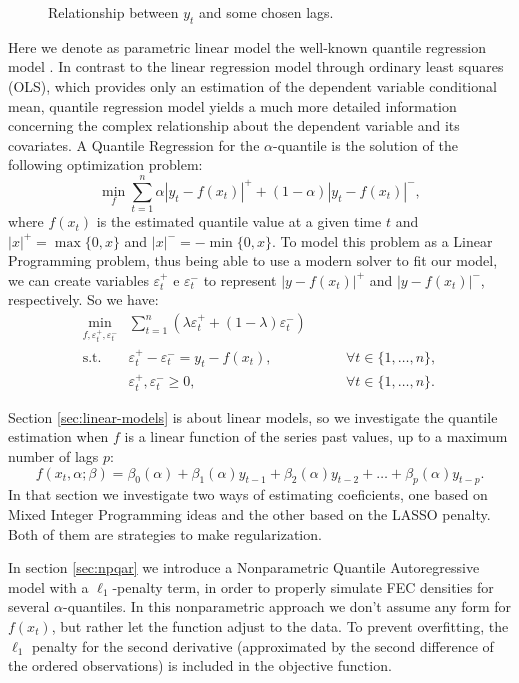 \begin{figure}
\begin{minipage}[t]{0.45\linewidth}
\begin{minipage}[b]{\linewidth}
    \end{minipage}
  \end{minipage}
  \caption{Relationship between $y_t$ and some chosen lags.}
  \label{lags-icaraizinho}
\end{figure}

Here we denote as parametric linear model the well-known quantile regression model \cite{koenker2005quantile}. In contrast to the linear regression model through ordinary least squares (OLS), which provides only an estimation of the dependent variable conditional mean, quantile regression model yields a much more detailed information concerning the complex relationship about the dependent variable and its covariates. A Quantile Regression for the $\alpha$-quantile is the solution of the following optimization problem:
\begin{equation}
\min_{f}\sum_{t=1}^{n}\alpha|y_{t}-f(x_t)|^{+}+(1-\alpha)|y_{t}-f(x_t)|^{-},
\label{eq:linear-model}
\end{equation}
where $f(x_t)$ is the estimated quantile value at a given time $t$ and $|x|^+=\max\{0,x\}$ and $|x|^-=-\min\{0,x\}$. To model this problem as a Linear Programming problem, thus being able to use a modern solver to fit our model,  we can create variables $\varepsilon^+_t$ e $\varepsilon^-_t$ to represent $|y-f(x_t)|^+$ and $|y-f(x_t)|^-$, respectively. So we have:
\begin{equation}
\begin{aligned}\min_{f,\varepsilon_{t}^{+}, \varepsilon_{t}^{-}} & \sum_{t=1}^{n}\left(\lambda\varepsilon_{t}^{+}+(1-\lambda)\varepsilon_{t}^{-}\right) & \\
\mbox{s.t. } & \varepsilon_{t}^{+}-\varepsilon_{t}^{-}=y_{t}-f(x_{t}), & \qquad\forall t \in \{1,\dots,n\},\\
& \varepsilon_t^+,\varepsilon_t^- \geq 0, & \qquad \forall t \in \{1,\dots,n\}.
\end{aligned}
\label{eq:qar-general}
\end{equation}

Section \ref{sec:linear-models} is about linear models, so we investigate the quantile estimation when $f$ is a linear function of the series past values, up to a maximum number of lags $p$:
\begin{equation}
	f(x_t, \alpha; \beta) = \beta_0(\alpha) + \beta_1(\alpha)y_{t-1} + \beta_2(\alpha)y_{t-2} + \dots + \beta_p(\alpha) y_{t-p}.
	\label{eq:ft-qar}
\end{equation}
In that section we investigate two ways of estimating coeficients, one based on Mixed Integer Programming ideas and the other based on the LASSO \cite{tibshirani1996regression} penalty. Both of them are strategies to make regularization.

In section \ref{sec:npqar} we introduce a Nonparametric Quantile Autoregressive model with a $\ell_{1}$-penalty term, in order to properly simulate FEC densities for several $\alpha$-quantiles. In this nonparametric approach we don't assume any form for $f(x_t)$, but rather let the function adjust to the data. To prevent overfitting, the $\ell_1$ penalty for the second derivative (approximated by the second difference of the ordered observations) is included in the objective function.